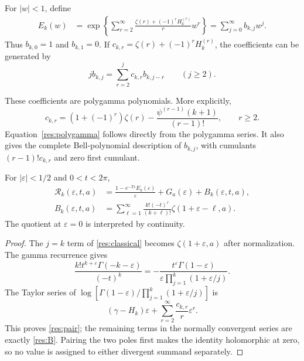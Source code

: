 \begin{definition}\label{res:coeffdef}
For $|w|<1$, define
\begin{align}
 E_k(w)&=\exp\left\{\sum_{r=2}^{\infty}
       \frac{\zeta(r)+(-1)^rH_k^{(r)}}{r}w^r\right\}
       =\sum_{j=0}^{\infty}b_{k,j}w^j.\label{res:E}
\end{align}
Thus $b_{k,0}=1$ and $b_{k,1}=0$. If
$c_{k,r}=\zeta(r)+(-1)^rH_k^{(r)}$, the coefficients can be generated by
\begin{equation}\label{res:recurrence}
 j b_{k,j}=\sum_{r=2}^j c_{k,r}b_{k,j-r}\qquad(j\geq2).
\end{equation}
\end{definition}

These coefficients are polygamma polynomials. More explicitly,
\begin{equation}\label{res:polygamma}
 c_{k,r}=(1+(-1)^r)\zeta(r)
       -\frac{\psi^{(r-1)}(k+1)}{(r-1)!},\qquad r\geq2.
\end{equation}
Equation~\eqref{res:polygamma} follows directly from the polygamma series.
It also gives the complete Bell-polynomial description of $b_{k,j}$, with
cumulants $(r-1)!c_{k,r}$ and zero first cumulant.

\begin{lemma}\label{res:exact}
For $|\varepsilon|<1/2$ and $0<t<2\pi$,
\begin{align}
 \mathcal R_k(\varepsilon,t,a)
  &=\frac{1-e^{-T\varepsilon}E_k(\varepsilon)}{\varepsilon}
          +G_a(\varepsilon)+B_k(\varepsilon,t,a),\label{res:pair}\\
 B_k(\varepsilon,t,a)
  &=\sum_{\ell=1}^{\infty}
     \frac{k!(-t)^\ell}{(k+\ell)!}
     \zeta(1+\varepsilon-\ell,a).\label{res:B}
\end{align}
The quotient at $\varepsilon=0$ is interpreted by continuity.
\end{lemma}
\begin{proof}
The $j=k$ term of \eqref{res:classical} becomes
$\zeta(1+\varepsilon,a)$ after normalization. The gamma recurrence gives
\[
 \frac{k!t^{k+\varepsilon}\Gamma(-k-\varepsilon)}{(-t)^k}
 =-\frac{t^\varepsilon\Gamma(1-\varepsilon)}
       {\varepsilon\prod_{j=1}^k(1+\varepsilon/j)}.
\]
The Taylor series of
$\log[\Gamma(1-\varepsilon)/\prod_{j=1}^k(1+\varepsilon/j)]$ is
\[
 (\gamma-H_k)\varepsilon
  +\sum_{r=2}^{\infty}\frac{c_{k,r}}r\varepsilon^r.
\]
This proves \eqref{res:pair}; the remaining terms in the normally convergent
series are exactly \eqref{res:B}. Pairing the two poles first makes the
identity holomorphic at zero, so no value is assigned to either divergent
summand separately.
\end{proof}

